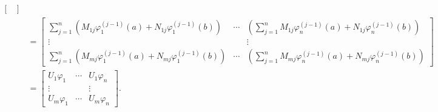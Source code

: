 \documentclass[11pt, oneside, a4paper]{article}
\begin{document}
{\begin{rmk}
\begin{align*}
\begin{bmatrix}
        \end{bmatrix}\\
        &= \begin{bmatrix}
            \sum_{j=1}^n(M_{1j}\varphi_1^{(j-1)}(a) + N_{1j}\varphi_1^{(j-1)}(b)) & \cdots & (\sum_{j=1}^nM_{1j}\varphi_n^{(j-1)}(a) + N_{1j}\varphi_n^{(j-1)}(b))\\
            \vdots & & \vdots\\
            \sum_{j=1}^n(M_{mj}\varphi_1^{(j-1)}(a) + N_{mj}\varphi_1^{(j-1)}(b)) & \cdots & (\sum_{j=1}^nM_{mj}\varphi_n^{(j-1)}(a) + N_{mj}\varphi_n^{(j-1)}(b))
        \end{bmatrix}\\
        &= \begin{bmatrix}
            U_1\varphi_1 & \cdots & U_1\varphi_n\\
            \vdots & & \vdots\\
            U_m\varphi_1 & \cdots & U_m\varphi_n
        \end{bmatrix}.
    \end{align*}
\end{rmk}
}
\end{document}
